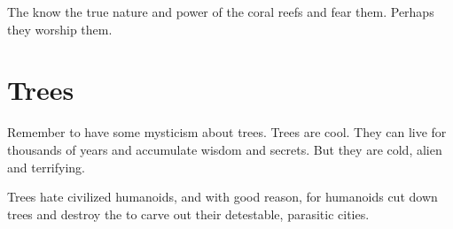 The \nagae{} know the true nature and power of the coral reefs and fear them. 
Perhaps they worship them. 















\section{Trees}
Remember to have some mysticism about trees. Trees are cool. They can live for thousands of years and accumulate wisdom and secrets. But they are cold, alien and terrifying. 

Trees hate civilized humanoids, and with good reason, for humanoids cut down trees and destroy the \Wylde{} to carve out their detestable, parasitic cities. 























